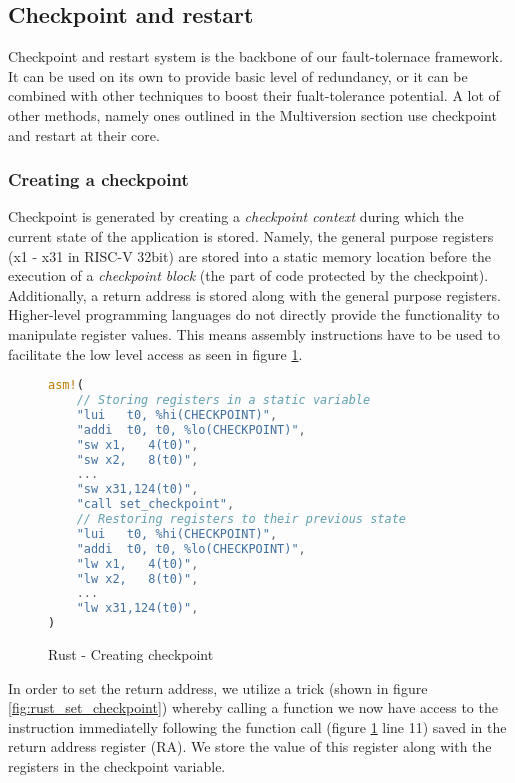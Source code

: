 \subsection{Checkpoint and restart}

Checkpoint and restart system is the backbone of our fault-tolernace framework. It can be used on its own to provide basic level of redundancy, or it can be combined with other techniques to boost their fualt-tolerance potential. A lot of other methods, namely ones outlined in the Multiversion section use checkpoint and restart at their core.

\subsubsection{Creating a checkpoint} \label{sec:creating_checkpoint}

Checkpoint is generated by creating a \textit{checkpoint context} during which the current state of the application is stored. Namely, the general purpose registers (x1 - x31 in RISC-V 32bit) are stored into a static memory location before the execution of a \textit{checkpoint block} (the part of code protected by the checkpoint). Additionally, a return address is stored along with the general purpose registers. Higher-level programming languages do not directly provide the functionality to manipulate register values. This means assembly instructions have to be used to facilitate the low level access as seen in figure \ref{fig:rust_create_checkpoint}.

\begin{figure}[!h]
\begin{lstlisting}[language=Rust]
asm!(
    // Storing registers in a static variable
    "lui   t0, %hi(CHECKPOINT)",
    "addi  t0, t0, %lo(CHECKPOINT)",
    "sw x1,   4(t0)",
    "sw x2,   8(t0)",
    ...
    "sw x31,124(t0)",
    "call set_checkpoint",
    // Restoring registers to their previous state
    "lui   t0, %hi(CHECKPOINT)",
    "addi  t0, t0, %lo(CHECKPOINT)",
    "lw x1,   4(t0)",
    "lw x2,   8(t0)",
    ...
    "lw x31,124(t0)",
)
\end{lstlisting}
\caption{Rust - Creating checkpoint}
\label{fig:rust_create_checkpoint}
\end{figure}

In order to set the return address, we utilize a trick (shown in figure \ref{fig:rust_set_checkpoint}) whereby calling a function we now have access to the instruction immediatelly following the function call (figure \ref{fig:rust_create_checkpoint} line 11) saved in the return address register (RA). We store the value of this register along with the registers in the checkpoint variable.


